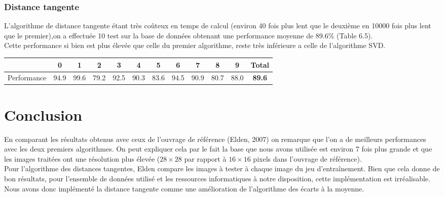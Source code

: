 \documentclass[a4paper,11pt,twoside]{report}
\begin{document}
\subsection{Distance tangente}
L’algorithme de distance tangente étant très coûteux en temps de calcul (environ 40 fois plus lent que le deuxième en 10000 fois plus lent que le premier),on a effectuée 10 test sur la base de données obtenant une performance moyenne de 89.6\% (Table 6.5).\\
Cette performance si bien est plus élevée que celle du premier algorithme, reste très inférieure a celle de l'algorithme SVD. 

\begin{center}
\begin{tabular}{ |c||c|c|c|c|c|c|c|c|c|c|c| } 
 \hline
   & 0 & 1 & 2 & 3 & 4 & 5 & 6 & 7 & 8 & 9 & \textbf{Total} \\ 
  \hline
  \hline
 Performance & 94.9 & 99.6 & 79.2 & 92.5 & 90.3 & 83.6 & 94.5 & 90.9 & 80.7 & 88.0 &  \textbf{89.6} \\

 \hline
\end{tabular}
\end{center}


\chapter{Conclusion}
En comparant les résultats obtenus avec ceux de l'ouvrage de référence (Elden, 2007) on remarque que l'on a de meilleurs performances avec les deux premiers algorithmes. On peut expliquer cela par le fait la base que nous avons utilisée est environ 7 fois plus grande et que les images traitées ont une résolution plus élevée ($28\times 28$ par rapport à $16\times 16$ pixels dans l'ouvrage de référence).\\
Pour l'algorithme des distances tangentes, Elden compare les images à tester à chaque image du jeu d'entraînement. Bien que cela donne de bon résultats, pour l'ensemble de données utilisé et les ressources informatiques à notre disposition, cette implémentation est irréalisable. Nous avons donc implémenté la distance tangente comme une amélioration de l'algorithme des écarts à la moyenne. 



\end{document}
